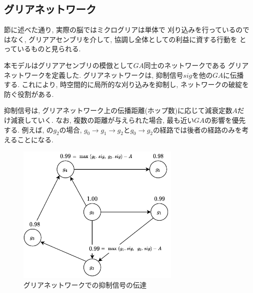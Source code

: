 \documentclass[a4paper,10.5pt,twocolumn]{jsarticle}
\begin{document}
\subsection{グリアネットワーク}
節に述べた通り, 実際の脳ではミクログリアは単体で
刈り込みを行っているのではなく, 
グリアアセンブリを介して, 協調し全体としての利益に資する行動を
とっているものと見られる.

本モデルはグリアアセンブリの模倣として$GA$同士のネットワークである
グリアネットワークを定義した.
グリアネットワークは, 抑制信号$sig$を他の$GA$に伝播する.
これにより, 時空間的に局所的な刈り込みを抑制し, ネットワークの破綻を防ぐ役割がある.

抑制信号は, グリアネットワーク上の伝播距離(ホップ数)に応じて減衰定数$A$だけ減衰していく.
なお, 複数の距離が与えられた場合, 最も近い$GA$の影響を優先する.
例えば, の$g_2$の場合, 
$g_0\rightarrow g_1\rightarrow g_2$と$g_0\rightarrow g_2$の経路では後者の経路のみを考えることになる.
\vspace{-3zh}
\begin{figure}[H]
  \centering
  \includegraphics[width=8cm]{GliaNetworks.pdf}
  \caption{グリアネットワークでの抑制信号の伝達}
  \label{fig:GliaNetworks}
\end{figure}
\vspace{-2zh}
\end{document}
